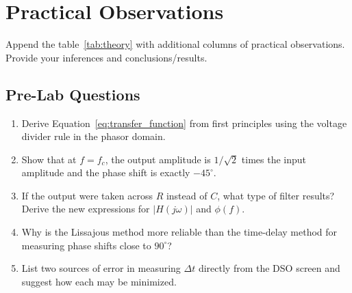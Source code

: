 \section*{Practical Observations}
Append the table~\ref{tab:theory} with additional columns of practical observations. Provide your inferences and conclusions/results.
\subsection*{Pre-Lab Questions}
\begin{enumerate}[label=Q\arabic*.]
	\item Derive Equation~\eqref{eq:transfer_function} from first principles using the voltage divider rule in the phasor domain.
	\item Show that at $f = f_c$, the output amplitude is $1/\sqrt{2}$ times the input amplitude and the phase shift is exactly $-45^\circ$.
	\item If the output were taken across $R$ instead of $C$, what type of filter results? Derive the new expressions for $|H(j\omega)|$ and $\phi(f)$.
	\item Why is the Lissajous method more reliable than the time-delay method for measuring phase shifts close to $90^\circ$?
	\item List two sources of error in measuring $\Delta t$ directly from the DSO screen and suggest how each may be minimized.
\end{enumerate}

